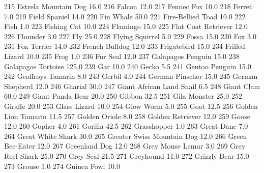 \documentclass[a4paper]{article}
\begin{document}
\begin{Schunk}
\begin{Soutput}
215           Estrela Mountain Dog     16.0
216                         Falcon     12.0
217                     Fennec Fox     10.0
218                         Ferret      7.0
219                  Field Spaniel     14.0
220                      Fin Whale     50.0
221              Fire-Bellied Toad     10.0
222                           Fish      1.0
223                    Fishing Cat     10.0
224                       Flamingo     15.0
225            Flat Coat Retriever     12.0
226                       Flounder      3.0
227                            Fly     25.0
228                Flying Squirrel      5.0
229                          Fossa     15.0
230                            Fox      3.0
231                    Fox Terrier     14.0
232                 French Bulldog     12.0
233                    Frigatebird     15.0
234                 Frilled Lizard     10.0
235                           Frog      1.0
236                       Fur Seal     12.0
237              Galapagos Penguin     15.0
238             Galapagos Tortoise    125.0
239                            Gar     10.0
240                          Gecko      5.5
241                 Gentoo Penguin     15.0
242              Geoffroys Tamarin      8.0
243                         Gerbil      4.0
244                German Pinscher     15.0
245                German Shepherd     12.0
246                        Gharial     30.0
247       Giant African Land Snail      6.5
248                     Giant Clam     60.0
249               Giant Panda Bear     20.0
250                         Gibbon     32.5
251                   Gila Monster     25.0
252                        Giraffe     20.0
253                   Glass Lizard     10.0
254                      Glow Worm      5.0
255                           Goat     12.5
256            Golden Lion Tamarin     11.5
257                  Golden Oriole      8.0
258               Golden Retriever     12.0
259                          Goose     12.0
260                         Gopher      4.0
261                        Gorilla     42.5
262                    Grasshopper      1.0
263                     Great Dane      7.0
264              Great White Shark     30.0
265     Greater Swiss Mountain Dog     12.0
266                Green Bee-Eater     12.0
267                  Greenland Dog     12.0
268               Grey Mouse Lemur      3.0
269                Grey Reef Shark     25.0
270                      Grey Seal     21.5
271                      Greyhound     11.0
272                   Grizzly Bear     15.0
273                         Grouse      1.0
274                    Guinea Fowl     10.0

\end{Soutput}
\end{Schunk}
\end{document}
